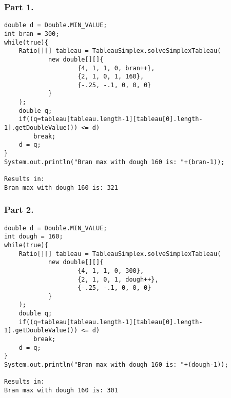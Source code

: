 \documentclass[11pt,a4paper,openany]{report}
\begin{document}
\subsubsection{Part 1.}
\begin{verbatim}
double d = Double.MIN_VALUE;
int bran = 300;
while(true){
    Ratio[][] tableau = TableauSimplex.solveSimplexTableau(
            new double[][]{
                    {4, 1, 1, 0, bran++},
                    {2, 1, 0, 1, 160},
                    {-.25, -.1, 0, 0, 0}
            }
    );
    double q;
    if((q=tableau[tableau.length-1][tableau[0].length-1].getDoubleValue()) <= d)
        break;
    d = q;
}
System.out.println("Bran max with dough 160 is: "+(bran-1));

Results in:
Bran max with dough 160 is: 321
\end{verbatim}
\subsubsection{Part 2.}
\begin{verbatim}
double d = Double.MIN_VALUE;
int dough = 160;
while(true){
    Ratio[][] tableau = TableauSimplex.solveSimplexTableau(
            new double[][]{
                    {4, 1, 1, 0, 300},
                    {2, 1, 0, 1, dough++},
                    {-.25, -.1, 0, 0, 0}
            }
    );
    double q;
    if((q=tableau[tableau.length-1][tableau[0].length-1].getDoubleValue()) <= d)
        break;
    d = q;
}
System.out.println("Bran max with dough 160 is: "+(dough-1));

Results in:
Bran max with dough 160 is: 301

\end{verbatim}
\end{document}
